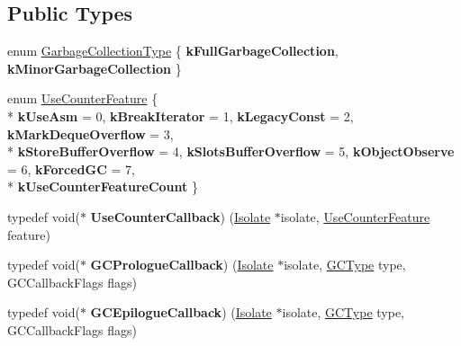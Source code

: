 \subsection*{Public Types}
\begin{DoxyCompactItemize}
\item 
enum \hyperlink{classv8_1_1Isolate_a5ae00cc99d8aca148c6f5f9698c432c9}{Garbage\+Collection\+Type} \{ {\bfseries k\+Full\+Garbage\+Collection}, 
{\bfseries k\+Minor\+Garbage\+Collection}
 \}
\item 
enum \hyperlink{classv8_1_1Isolate_aed6909379c3f2820cb3084710b73385d}{Use\+Counter\+Feature} \{ \\*
{\bfseries k\+Use\+Asm} = 0, 
{\bfseries k\+Break\+Iterator} = 1, 
{\bfseries k\+Legacy\+Const} = 2, 
{\bfseries k\+Mark\+Deque\+Overflow} = 3, 
\\*
{\bfseries k\+Store\+Buffer\+Overflow} = 4, 
{\bfseries k\+Slots\+Buffer\+Overflow} = 5, 
{\bfseries k\+Object\+Observe} = 6, 
{\bfseries k\+Forced\+G\+C} = 7, 
\\*
{\bfseries k\+Use\+Counter\+Feature\+Count}
 \}
\item 
\hypertarget{classv8_1_1Isolate_a7537ead98ee88eec2976348ba992935c}{}typedef void($\ast$ {\bfseries Use\+Counter\+Callback}) (\hyperlink{classv8_1_1Isolate}{Isolate} $\ast$isolate, \hyperlink{classv8_1_1Isolate_aed6909379c3f2820cb3084710b73385d}{Use\+Counter\+Feature} feature)\label{classv8_1_1Isolate_a7537ead98ee88eec2976348ba992935c}

\item 
\hypertarget{classv8_1_1Isolate_ab14f02c51e012f839e6cc184ede4814a}{}typedef void($\ast$ {\bfseries G\+C\+Prologue\+Callback}) (\hyperlink{classv8_1_1Isolate}{Isolate} $\ast$isolate, \hyperlink{namespacev8_ac109d6f27e0c0f9ef4e98bcf7a806cf2}{G\+C\+Type} type, G\+C\+Callback\+Flags flags)\label{classv8_1_1Isolate_ab14f02c51e012f839e6cc184ede4814a}

\item 
\hypertarget{classv8_1_1Isolate_a3e7351067af07d2a56c57d855fada4bb}{}typedef void($\ast$ {\bfseries G\+C\+Epilogue\+Callback}) (\hyperlink{classv8_1_1Isolate}{Isolate} $\ast$isolate, \hyperlink{namespacev8_ac109d6f27e0c0f9ef4e98bcf7a806cf2}{G\+C\+Type} type, G\+C\+Callback\+Flags flags)\label{classv8_1_1Isolate_a3e7351067af07d2a56c57d855fada4bb}

\end{DoxyCompactItemize}
